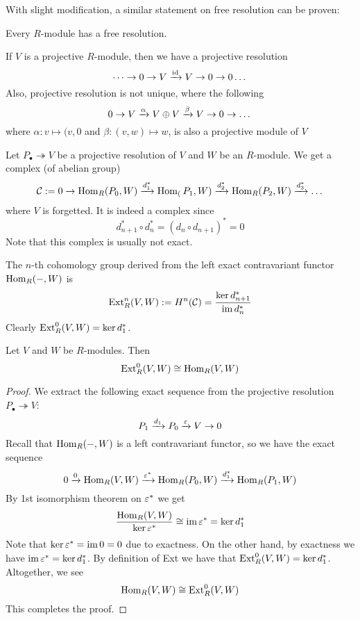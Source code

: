 With slight modification, a similar statement on free resolution can be proven:

\medskip

\begin{pro}
    Every $R$-module has a free resolution.
\end{pro}

\medskip

\begin{re}
    If $V$ is a projective $R$-module, then we have a projective resolution
    \[\dots \to 0 \to V \xrightarrow{\operatorname{id}} V \to 0 \to 0 \dots\]
    Also, projective resolution is not unique, where the following
    \[0 \to V \xrightarrow{\alpha} V\oplus V \xrightarrow{\beta} V \to 0 \to \dots\]
    where $\alpha:v\mapsto (v,0$ and $\beta:(v,w)\mapsto w$, is also a projective module of $V$
\end{re}

\medskip

\begin{defn}
    Let $P_\bullet \twoheadrightarrow V$ be a projective resolution of $V$ and $W$ be an $R$-module. We get a complex (of abelian group)
    \[\mathcal C:=0 \to \operatorname{Hom}_R(P_0, W)\xrightarrow{d_1^*} \operatorname{Hom}_(P_1, W) \xrightarrow{d_2^*} \operatorname{Hom}_R(P_2, W)\xrightarrow{d^*_3}\dots\]
    where $V$ is forgetted. It is indeed a complex since
    \[d_{n+1}^*\circ d_n^* = (d_n \circ d_{n+1})^* = 0\]
    Note that this complex is usually not exact.

    The $n$-th cohomology group derived from the left exact contravariant functor $\operatorname{Hom}_R(-, W)$ is 
    \[\operatorname{Ext}_R^n(V,W):= H^n(\mathcal C)=\frac{\ker d_{n+1}^*}{\operatorname{im} d_n^*}\]
    Clearly $\operatorname{Ext}_R^0(V,W) = \ker d_1 ^*$.
\end{defn}

\medskip

\begin{pro}
    Let $V$ and $W$ be $R$-modules. Then
    \[\operatorname{Ext}^0_R(V,W) \cong \operatorname{Hom}_R(V,W)\]
\end{pro}
\begin{proof}
    We extract the following exact sequence from the projective resolution $P_\bullet \twoheadrightarrow V$:
    \[P_1 \xrightarrow{d_1} P_0 \xrightarrow{\varepsilon} V \to 0\]
    Recall that $\operatorname{Hom}_R(-,W)$ is a left contravariant functor, so we have the exact sequence
    \[0 \xrightarrow{0} \operatorname{Hom}_R(V,W) \xrightarrow{\varepsilon^*} \operatorname{Hom}_R(P_0, W) \xrightarrow{d_1^*} \operatorname{Hom}_R(P_1,W)\]
    By 1st isomorphism theorem on $\varepsilon^*$ we get 
    \[\frac{\operatorname{Hom}_R(V,W)}{\ker \varepsilon^*}\cong \operatorname{im}\varepsilon^* = \ker d_1^*\]
    Note that $\ker \varepsilon^* = \operatorname{im} 0 = 0$ due to exactness. On the other hand, by exactness we have $\operatorname{im} \varepsilon^* = \ker d_1^*$. By definition of Ext we have that $\operatorname{Ext}^0_R(V,W) = \ker d_1^*$. Altogether, we see
    \[\operatorname{Hom}_R(V,W) \cong \operatorname{Ext}_R^0(V,W)\]
    This completes the proof.
\end{proof}